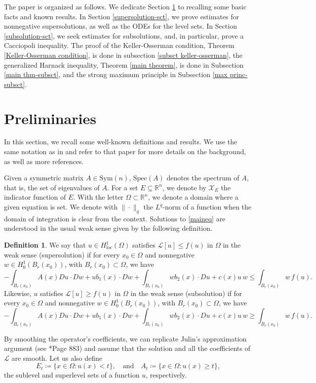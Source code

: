\documentclass[12pt,a4paper]{amsart}
\numberwithin{equation}{section} %
\theoremstyle{definition}
\newtheorem{definition}[theorem]{Definition}
\theoremstyle{remark}
\begin{document}
The paper is organized as follows. We dedicate Section \ref{prelim-sct} to recalling some basic facts and known results. In Section \ref{supersolution-sct}, we prove estimates for nonnegative supersolutions, as well as the ODEs for the level sets. In Section \ref{subsolution-sct}, we seek estimates for subsolutions, and, in particular, prove a Cacciopoli inequality. The proof of the Keller-Osserman condition, Theorem \ref{Keller-Osserman condition}, is done in subsection \ref{subsct keller-osserman}, the generalized Harnack inequality, Theorem \ref{main theorem}, is done in Subsection \ref{main thm-subsct}, and the strong maximum principle in Subsection \ref{max princ-subsct}.

\section{Preliminaries}\label{prelim-sct}

In this section, we recall some well-known definitions and results. We use the same notation as in \cite{VJ1} and refer to that paper for more details on the background, as well as more references. 

Given a symmetric matrix $A \in \mbox{Sym}(n)$, $\mbox{Spec}(A)$ denotes the spectrum of $A$, that is, the set of eigenvalues of $A$. For a set $E \subseteq \mathbb{R}^n$, we denote by $\mathcal{X}_{E}$  the indicator function of  $E$. With the letter $\Omega \subset \mathbb{R}^n$, we denote a domain where a given equation is set. We denote with $\|\cdot\|_q$ the $L^q$-norm of a function when the domain of integration is clear from the context.  Solutions to \eqref{maineq} are understood in the usual weak sense given by the following definition.

\begin{definition}\label{definition of soolution}
We say that $u\in H^1_{\mathrm{loc}}(\Omega)$ satisfies $\mathcal{L}[u] \leq f(u)$ in $\Omega$ in the weak sense (supersolution) if for every $x_0 \in \Omega$ and nonnegative $w \in H^1_0(B_r(x_0))$, with $B_r(x_0) \subset \Omega$, we have
$$
    -\int_{B_r(x_0)} A(x)Du \cdot Dw + ub_1(x)\cdot Dw + \int_{B_r(x_0)} wb_2(x)\cdot Du + c(x)u\,w \leq \int_{B_r(x_0)}w\,f(u).
$$
Likewise, $u$ satisfies $\mathcal{L}[u] \geq f(u)$ in $\Omega$ in the weak sense (subsolution) if for every $x_0 \in \Omega$ and nonnegative $w \in H^1_0(B_r(x_0))$, with $B_r(x_0) \subset \Omega$, we have
$$
    -\int_{B_r(x_0)} A(x)Du \cdot Dw + ub_1(x)\cdot Dw + \int_{B_r(x_0)} wb_2(x)\cdot Du + c(x)u\,w \geq \int_{B_r(x_0)}w\,f(u).
$$
\end{definition}
By smoothing the operator's coefficients, we can replicate Julin's approximation argument (see \cite{VJ1}*{Page 883}) and assume that the solution and all the coefficients of $\mathcal{L}$ are smooth. Let us also define 
$$
    E_{t} \coloneqq \{x \in \Omega \colon u(x) < t\}, \quad \text{and} \quad A_t \coloneqq \{x \in \Omega \colon u(x) \geq t \},
$$
the sublevel and superlevel sets of a function $u$, respectively.
\end{document}
